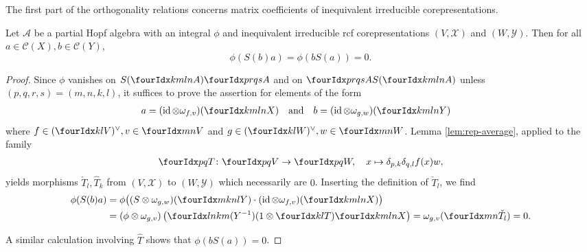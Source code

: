 The first part of the orthogonality relations concerns matrix
coefficients of inequivalent irreducible corepresentations. 
\begin{Prop} \label{prop:rep-orthogonality-1} Let $\mathcal{A}$ be a
  partial Hopf algebra with an integral $\phi$ and inequivalent
  irreducible rcf corepresentations $(V,\mathscr{X})$ and
  $(W,\mathscr{Y})$.  Then  for all
  $a\in \mathcal{C}(X), b \in \mathcal{C}(Y)$,
  \[\phi(S(b)a) = \phi(bS(a))=0.\]
\end{Prop}
\begin{proof}
Since $\phi$ vanishes on $S(\Gr{A}{k}{l}{m}{n})\Gr{A}{p}{q}{r}{s}$ and
on $\Gr{A}{p}{q}{r}{s}S(\Gr{A}{k}{l}{m}{n})$ unless
$(p,q,r,s) = (m,n,k,l)$, it suffices to prove the assertion for  elements of the form
\begin{align*}
  a&=(\id \otimes \omega_{f,v})(\Gr{X}{k}{l}{m}{n})  && \text{and} &
  b&=(\id \otimes \omega_{g,w})(\Gr{Y}{k}{l}{m}{n})
\end{align*}
where $f\in \dual{(\Gru{V}{k}{l})}, v \in \Gru{V}{m}{n}$ and $g \in
\dual{(\Gru{W}{k}{l})}, w \in \Gru{W}{m}{n}$.  Lemma
\ref{lem:rep-average}, applied to the family
  \begin{align*}
    \Gru{T}{p}{q} \colon \Gru{V}{p}{q} \to \Gru{W}{p}{q}, \quad x
    \mapsto  \delta_{p,k}\delta_{q,l}  f(x)w,
  \end{align*}
  yields morphisms $\check{T}_l,\hat{T}_k$ from $(V,\mathscr{X})$ to
  $(W,\mathscr{Y})$ which necessarily are $0$. Inserting the
  definition of $\check{T}_l$, we find
  \begin{align*}
    \phi(S(b)a) &= \phi\big((S \otimes
    \omega_{g,w})(\Gr{Y}{m}{n}{k}{l}) \cdot (\id \otimes
    \omega_{f,v})(\Gr{X}{k}{l}{m}{n})\big) \\ &= (\phi \otimes \omega_{g,v})\left(\Gr{(Y^{-1})}{l}{k}{n}{m}(1 \otimes
      \Gru{T}{k}{l} )     \Gr{X}{k}{l}{m}{n}\right) 
    = \omega_{g,v}( \Gru{\check{T}_l}{m}{n}) = 0.
  \end{align*}%
  
  A similar calculation involving $\hat{T}$ shows that
  $\phi(bS(a))=0$.  
\end{proof}

